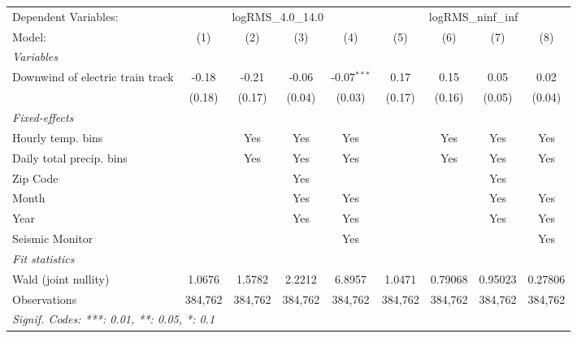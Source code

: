 
\begingroup
\centering
\begin{tabular}{lcccccccc}
   \tabularnewline \midrule \midrule
   Dependent Variables: & \multicolumn{4}{c}{logRMS\_4.0\_14.0} & \multicolumn{4}{c}{logRMS\_ninf\_inf}\\
   Model:                           & (1)     & (2)     & (3)     & (4)           & (5)     & (6)     & (7)     & (8)\\  
   \midrule
   \emph{Variables}\\
   Downwind of electric train track & -0.18   & -0.21   & -0.06   & -0.07$^{***}$ & 0.17    & 0.15    & 0.05    & 0.02\\   
                                    & (0.18)  & (0.17)  & (0.04)  & (0.03)        & (0.17)  & (0.16)  & (0.05)  & (0.04)\\   
   \midrule
   \emph{Fixed-effects}\\
   Hourly temp. bins                &         & Yes     & Yes     & Yes           &         & Yes     & Yes     & Yes\\  
   Daily total precip. bins         &         & Yes     & Yes     & Yes           &         & Yes     & Yes     & Yes\\  
   Zip Code                         &         &         & Yes     &               &         &         & Yes     & \\  
   Month                            &         &         & Yes     & Yes           &         &         & Yes     & Yes\\  
   Year                             &         &         & Yes     & Yes           &         &         & Yes     & Yes\\  
   Seismic Monitor                  &         &         &         & Yes           &         &         &         & Yes\\  
   \midrule
   \emph{Fit statistics}\\
   Wald (joint nullity)             & 1.0676  & 1.5782  & 2.2212  & 6.8957        & 1.0471  & 0.79068 & 0.95023 & 0.27806\\  
   Observations                     & 384,762 & 384,762 & 384,762 & 384,762       & 384,762 & 384,762 & 384,762 & 384,762\\  
   \midrule \midrule
   \multicolumn{9}{l}{\emph{Signif. Codes: ***: 0.01, **: 0.05, *: 0.1}}\\
\end{tabular}
\par\endgroup


